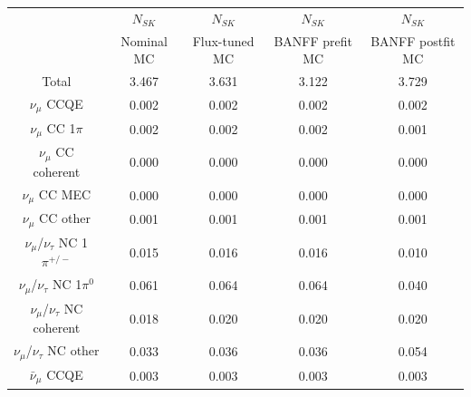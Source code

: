 \begin{table}


\begin{tabular} { | c ||c | c | c | c |  | }
\hline
                                                  & $N_{SK}$            & $N_{SK}$            & $N_{SK}$            & $N_{SK}$             \\ 
                                                  & Nominal MC          & Flux-tuned MC       & BANFF prefit MC     & BANFF postfit MC     \\ \hline 
Total                                             & 3.467               & 3.631               & 3.122               & 3.729                \\ \hline 
\hline 
$\nu_\mu$ CCQE                                    & 0.002               & 0.002               & 0.002               & 0.002                \\ \hline 
$\nu_\mu$ CC 1$\pi$                               & 0.002               & 0.002               & 0.002               & 0.001                \\ \hline 
$\nu_\mu$ CC coherent                             & 0.000               & 0.000               & 0.000               & 0.000                \\ \hline 
$\nu_\mu$ CC MEC                                  & 0.000               & 0.000               & 0.000               & 0.000                \\ \hline 
$\nu_\mu$ CC other                                & 0.001               & 0.001               & 0.001               & 0.001                \\ \hline 
$\nu_\mu$/$\nu_\tau$ NC 1$\pi^{+/-}$              & 0.015               & 0.016               & 0.016               & 0.010                \\ \hline 
$\nu_\mu$/$\nu_\tau$ NC 1$\pi^0$                  & 0.061               & 0.064               & 0.064               & 0.040                \\ \hline 
$\nu_\mu$/$\nu_\tau$ NC coherent                  & 0.018               & 0.020               & 0.020               & 0.020                \\ \hline 
$\nu_\mu$/$\nu_\tau$ NC other                     & 0.033               & 0.036               & 0.036               & 0.054                \\ \hline 
$\bar{\nu}_\mu$ CCQE                              & 0.003               & 0.003               & 0.003               & 0.003                \\ \hline 

\end{tabular}
\end{table}
